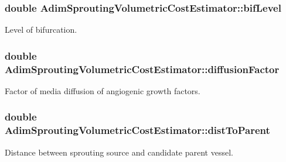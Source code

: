 \subsubsection[{\texorpdfstring{bif\+Level}{bifLevel}}]{\setlength{\rightskip}{0pt plus 5cm}double Adim\+Sprouting\+Volumetric\+Cost\+Estimator\+::bif\+Level\hspace{0.3cm}{\ttfamily [private]}}\hypertarget{class_adim_sprouting_volumetric_cost_estimator_a04c0ad4a538a899e3b308a817348ce0f}{}\label{class_adim_sprouting_volumetric_cost_estimator_a04c0ad4a538a899e3b308a817348ce0f}
Level of bifurcation. 
\subsubsection[{\texorpdfstring{diffusion\+Factor}{diffusionFactor}}]{\setlength{\rightskip}{0pt plus 5cm}double Adim\+Sprouting\+Volumetric\+Cost\+Estimator\+::diffusion\+Factor\hspace{0.3cm}{\ttfamily [private]}}\hypertarget{class_adim_sprouting_volumetric_cost_estimator_a1a4df5f80756f1559f76b8e980e48cf7}{}\label{class_adim_sprouting_volumetric_cost_estimator_a1a4df5f80756f1559f76b8e980e48cf7}
Factor of media diffusion of angiogenic growth factors. 
\subsubsection[{\texorpdfstring{dist\+To\+Parent}{distToParent}}]{\setlength{\rightskip}{0pt plus 5cm}double Adim\+Sprouting\+Volumetric\+Cost\+Estimator\+::dist\+To\+Parent\hspace{0.3cm}{\ttfamily [private]}}\hypertarget{class_adim_sprouting_volumetric_cost_estimator_aab34b0032a1dd58352bce32596c6925c}{}\label{class_adim_sprouting_volumetric_cost_estimator_aab34b0032a1dd58352bce32596c6925c}
Distance between sprouting source and candidate parent vessel. 
